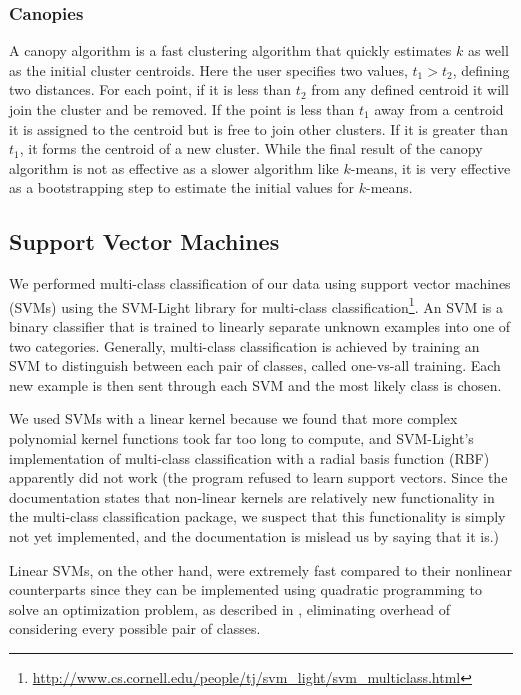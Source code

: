 \documentclass[12pt]{article}
\begin{document}
\subsubsection{Canopies}
A canopy algorithm is a fast clustering algorithm that quickly estimates $k$ as well as the initial cluster centroids. Here the user specifies two values, $t_1 > t_2$, defining two distances. For each point, if it is less than $t_2$ from any defined centroid it will join the cluster and be removed. If the point is less than $t_1$ away from a centroid it is assigned to the centroid but is free to join other clusters. If it is greater than $t_1$, it forms the centroid of a new cluster. While the final result of the canopy algorithm is not as effective as a slower algorithm like $k$-means, it is very effective as a bootstrapping step to estimate the initial values for $k$-means.

\subsection{Support Vector Machines}
We performed multi-class classification of our data using support vector machines (SVMs) using the SVM-Light library for multi-class classification\footnote{\protect\url{http://www.cs.cornell.edu/people/tj/svm_light/svm_multiclass.html}}. An SVM is a binary classifier that is trained to linearly separate unknown examples into one of two categories. Generally, multi-class classification is achieved by training an SVM to distinguish between each pair of classes, called one-vs-all training. Each new example is then sent through each SVM and the most likely class is chosen. 

We used SVMs with a linear kernel because we found that more complex polynomial kernel functions took far too long to compute, and SVM-Light’s implementation of multi-class classification with a radial basis function (RBF) apparently did not work (the program refused to learn support vectors. Since the documentation states that non-linear kernels are relatively new functionality in the multi-class classification package, we suspect that this functionality is simply not yet implemented, and the documentation is mislead us by saying that it is.)

Linear SVMs, on the other hand, were extremely fast compared to their nonlinear counterparts since they can be implemented using quadratic programming to solve an optimization problem, as described in \cite{crammer-singer-01}, eliminating overhead of considering every possible pair of classes.
				
\end{document}
